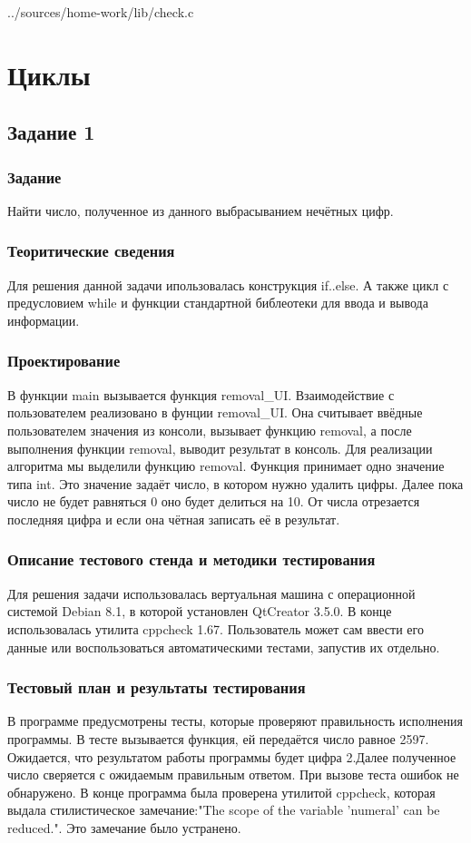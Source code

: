 \documentclass[12pt,a4paper]{report}
\begin{document}

{../sources/home-work/lib/check.c}

\chapter{Циклы}
\section{Задание 1}
\subsection{Задание}
Найти число, полученное из данного выбрасыванием нечётных цифр.
\subsection{Теоритические сведения}
Для решения данной задачи ипользовалась конструкция if..else. А также цикл с предусловием while и функции стандартной библеотеки для ввода и вывода информации.
\subsection{Проектирование}
В функции main вызывается функция removal\_UI. Взаимодействие с пользователем реализовано в фунции removal\_UI. Она считывает ввёдные пользователем значения из консоли, вызывает функцию removal, а после выполнения функции removal, выводит результат в консоль. Для реализации алгоритма мы выделили функцию removal. Функция принимает одно значение типа int. Это значение задаёт число, в котором нужно удалить цифры. Далее пока число не будет равняться 0 оно будет делиться на 10. От числа отрезается последняя цифра и если она чётная записать её в результат.
\subsection{Описание тестового стенда и методики тестирования}
Для решения задачи использовалась вертуальная машина с операционной системой Debian 8.1, в которой установлен QtCreator 3.5.0. В конце использовалась утилита cppcheck 1.67.
Пользователь может сам ввести его данные или воспользоваться автоматическими тестами, запустив их отдельно.
\subsection{Тестовый план и результаты тестирования}
В программе предусмотрены тесты, которые проверяют правильность исполнения программы. В тесте вызывается функция, ей передаётся число равное 2597. Ожидается, что результатом работы программы будет цифра 2.Далее полученное число сверяется с ожидаемым правильным ответом. При вызове теста ошибок не обнаружено. В конце программа была проверена утилитой cppcheck, которая выдала стилистическое замечание:"The scope of the variable 'numeral' can be reduced.". Это замечание было устранено.
\end{document}
